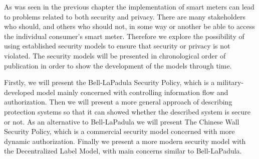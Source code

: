 
As was seen in the previous chapter the implementation of smart meters can lead to problems related to both security and privacy.
There are many stakeholders who should, and others who should not, in some way or another be able to access the individual consumer's smart meter.
Therefore we explore the possibility of using established security models to ensure that security or privacy is not violated.
The security models will be presented in chronological order of publication in order to show the development of the models through time.

Firstly, we will present the Bell-LaPadula Security Policy, which is a military-developed model mainly concerned with controlling information flow and authorization.
Then we will present a more general approach of describing protection systems so that it can showed whether the described system is secure or not.
As an alternative to Bell-LaPadula we will present The Chinese Wall Security Policy, which is a commercial security model concerned with more dynamic authorization.
Finally we present a more modern security model with the Decentralized Label Model, with main concerns similar to Bell-LaPadula.
